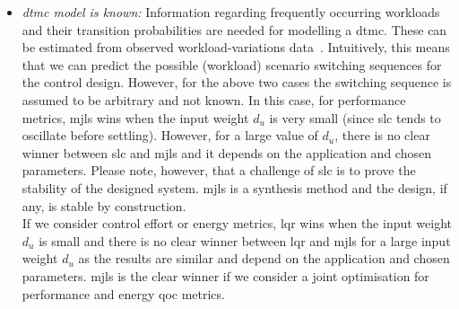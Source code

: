 \begin{itemize}
    \item \emph{\gls{dtmc} model is known:} Information regarding frequently occurring workloads and their transition probabilities are needed for modelling a \gls{dtmc}. These can be estimated from observed workload-variations data~\cite{welton2005estimation}. Intuitively, this means that we can predict the possible (workload) scenario switching sequences for the control design. However, for the above two cases the switching sequence is assumed to be arbitrary and not known.  In this case, for performance metrics, \gls{mjls} wins when the input weight $d_u$ is very small (since \gls{slc} tends to oscillate before settling). However, for a large value of $d_u$, there is no clear winner between \gls{slc} and \gls{mjls} and it depends on the application and chosen parameters. Please note, however, that a challenge of \gls{slc} is to prove the stability of the designed system. \gls{mjls} is a synthesis method and the design, if any, is stable by construction.\\
          If we consider control effort or energy metrics, \gls{lqr} wins when the input weight $d_u$ is small and there is no clear winner between \gls{lqr} and \gls{mjls} for a large input weight $d_u$ as the results are similar and depend on the application and chosen parameters. \gls{mjls} is the clear winner if we consider a joint optimisation for performance and energy \gls{qoc} metrics.
\end{itemize}